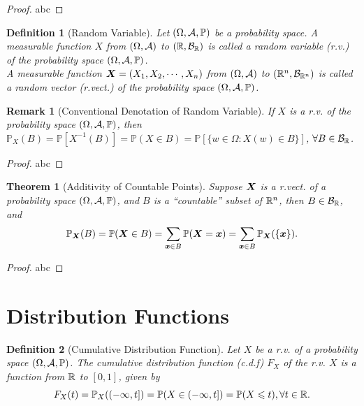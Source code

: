 \documentclass[openany,12pt]{book}
\newtheorem{theorem}{Theorem}[chapter]
\newtheorem{remark}{Remark}[chapter]
\newtheorem{definition}{Definition}[chapter]
\begin{document}
\begin{proof}
  abc
\end{proof}

\begin{definition}[Random Variable]
  Let $(\Omega,\mathcal{A},\mathbb{P})$ be a probability space. A measurable function $X$ from $(\Omega,\mathcal{A})$ to $(\mathbb{R},\mathcal{B}_{\mathbb{R}})$ is called a random variable (r.v.) of the probability space $(\Omega,\mathcal{A},\mathbb{P})$.\\
  A measurable function $\bm{X}=(X_1,X_2, \cdots,X_n)$ from $(\Omega,\mathcal{A})$ to $(\mathbb{R}^n,\mathcal{B}_{\mathbb{R}^n})$ is called a random vector (r.vect.) of the probability space $(\Omega,\mathcal{A},\mathbb{P})$.
\end{definition}

\begin{remark}[Conventional Denotation of Random Variable]
  If $X$ is a r.v. of the probability space $(\Omega,\mathcal{A},\mathbb{P})$, then $\mathbb{P}_X(B)=\mathbb{P}[X^{-1} (B)]=\mathbb{P}(X\in B)=\mathbb{P}[\{w\in\Omega:X(w)\in B\}]$, $\forall B\in\mathcal{B}_{\mathbb{R}}$.
\end{remark}

\begin{proof}
  abc
\end{proof}

\begin{theorem}[Additivity of Countable Points]
  Suppose $\bm{X}$ is a r.vect. of a probability space $(\Omega,\mathcal{A},\mathbb{P})$, and $B$ is a ``countable'' subset of $\mathbb{R}^n$, then $B\in\mathcal{B}_{\mathbb{R}}$, and
  $$
    \mathbb{P}_{\bm{X}} (B)=\mathbb{P}(\bm{X}\in B)=\sum_{\bm{x}\in B}\mathbb{P}(\bm{X}=\bm{x})=\sum_{\bm{x}\in B}\mathbb{P}_{\bm{X}}(\{\bm{x}\}).$$
\end{theorem}

\begin{proof}
  abc
\end{proof}

\section{Distribution Functions}

\begin{definition}[Cumulative Distribution Function]
  Let $X$ be a r.v. of a probability space $(\Omega,\mathcal{A},\mathbb{P})$. The cumulative distribution function (c.d.f) $F_X$ of the r.v. $X$ is a function from $\mathbb{R}$ to $[0,1]$, given by
  $$
    F_X(t)=\mathbb{P}_X((-\infty,t])=\mathbb{P}(X\in(-\infty,t])=\mathbb{P}(X\leqslant t), \forall t\in\mathbb{R}.
  $$
\end{definition}
\end{document}
